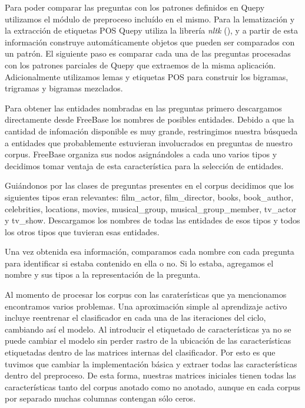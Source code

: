 Para poder comparar las preguntas con los patrones definidos en Quepy utilizamos el módulo de preproceso incluído en el mismo. Para la lematización y la extracción de etiquetas POS Quepy utiliza la librería \textit{nltk} (\citet{nltk}), y a partir de esta información construye automáticamente objetos que pueden ser comparados con un patrón. El siguiente paso es comparar cada una de las preguntas procesadas con los patrones parciales de Quepy que extraemos de la misma aplicación. Adicionalmente utilizamos lemas y etiquetas POS para construir los bigramas, trigramas y bigramas mezclados.

Para obtener las entidades nombradas en las preguntas primero descargamos directamente desde FreeBase los nombres de posibles entidades. Debido a que la cantidad de infomación disponible es muy grande, restringimos nuestra búsqueda a entidades que probablemente estuvieran involucrados en preguntas de nuestro corpus. FreeBase organiza sus nodos asignándoles a cada uno varios tipos y decidimos tomar ventaja de esta característica para la selección de entidades.

Guiándonos por las clases de preguntas presentes en el corpus decidimos que los siguientes tipos eran relevantes: film\_actor, film\_director, books, book\_author, celebrities, locations, movies, musical\_group, musical\_group\_member, tv\_actor y tv\_show. Descargamos los nombres de todas las entidades de esos tipos y todos los otros tipos que tuvieran esas entidades.

Una vez obtenida esa información, comparamos cada nombre con cada pregunta para identificar si estaba contenido en ella o no. Si lo estaba, agregamos el nombre y sus tipos a la representación de la pregunta.

Al momento de procesar los corpus con las caraterísticas que ya mencionamos encontramos varios problemas. Una aproximación simple al aprendizaje activo incluye reentrenar el clasificador en cada una de las iteraciones del ciclo, cambiando así el modelo. Al introducir el etiquetado de características ya no se puede cambiar el modelo sin perder rastro de la ubicación de las características etiquetadas dentro de las matrices internas del clasificador. Por esto es que tuvimos que cambiar la implementación básica y extraer todas las características dentro del preproceso. De esta forma, nuestras matrices iniciales tienen todas las características tanto del corpus anotado como no anotado, aunque en cada corpus por separado muchas columnas contengan sólo ceros.



